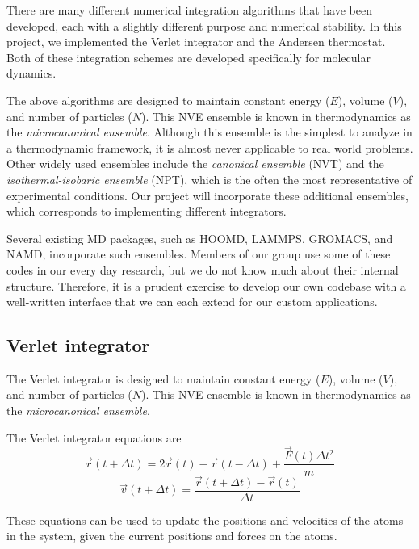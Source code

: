 \documentclass[10pt]{article}
\begin{document}
There are many different numerical integration algorithms that have been developed, each with a slightly different purpose and numerical stability.  
%
In this project, we implemented the Verlet integrator and the Andersen thermostat.
%
Both of these integration schemes are developed specifically for molecular dynamics.

The above algorithms are designed to maintain constant energy ($E$), volume ($V$), and number of particles ($N$).  This NVE ensemble is known in thermodynamics as the {\em microcanonical ensemble}.
Although this ensemble is the simplest to analyze in a thermodynamic framework, it is almost never applicable to real world problems.
Other widely used ensembles include the {\em canonical ensemble} (NVT) and the {\em isothermal-isobaric ensemble} (NPT), which is the often the most representative of experimental conditions.
Our project will incorporate these additional ensembles, which corresponds to implementing different integrators.

Several existing MD packages, such as HOOMD, LAMMPS, GROMACS, and NAMD, incorporate such ensembles. Members of our group use some of these codes in our every day research, but we do not know much about their internal structure. Therefore, it is a prudent exercise to develop our own codebase with a well-written interface that we can each extend for our custom applications.

\subsection{Verlet integrator}
The Verlet integrator is designed to maintain constant energy ($E$), volume ($V$), and number of particles ($N$).  
%
This NVE ensemble is known in thermodynamics as the {\em microcanonical ensemble}.

The Verlet integrator equations are
$$ \overrightarrow{r}(t + \Delta t) = 2 \overrightarrow{r}(t) - \overrightarrow{r}(t- \Delta t) + \frac{\overrightarrow{F}(t) \Delta t ^2}{m}$$
$$ \overrightarrow{v}(t + \Delta t) = \frac{\overrightarrow{r}(t + \Delta t) - \overrightarrow{r}(t)} {\Delta t} $$

These equations can be used to update the positions and velocities of the atoms in the system, given the current positions and forces on the atoms.
\end{document}
